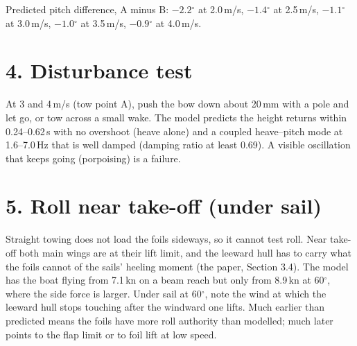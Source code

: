 \documentclass[11pt]{article}
\begin{document}
\begin{table}[h]
\centering\small
\caption*{\textbf{Tow point B (mast foot).} Take-off at 1.69\,m/s.}
\end{table}

\noindent Predicted pitch difference, A minus B: $-2.2$$^\circ$ at 2.0\,m/s, $-1.4$$^\circ$ at 2.5\,m/s, $-1.1$$^\circ$ at 3.0\,m/s, $-1.0$$^\circ$ at 3.5\,m/s, $-0.9$$^\circ$ at 4.0\,m/s.

\section*{4. Disturbance test}
At 3 and 4\,m/s (tow point A), push the bow down about 20\,mm with a pole and let go, or tow across a small wake. The model predicts the height returns within 0.24--0.62\,s with no overshoot (heave alone) and a coupled heave--pitch mode at 1.6--7.0\,Hz that is well damped (damping ratio at least 0.69). A visible oscillation that keeps going (porpoising) is a failure.

\section*{5. Roll near take-off (under sail)}
Straight towing does not load the foils sideways, so it cannot test roll. Near take-off both main wings are at their lift limit, and the leeward hull has to carry what the foils cannot of the sails' heeling moment (the paper, Section 3.4). The model has the boat flying from 7.1\,kn on a beam reach but only from 8.9\,kn at 60$^\circ$, where the side force is larger. Under sail at 60$^\circ$, note the wind at which the leeward hull stops touching after the windward one lifts. Much earlier than predicted means the foils have more roll authority than modelled; much later points to the flap limit or to foil lift at low speed.
\end{document}
